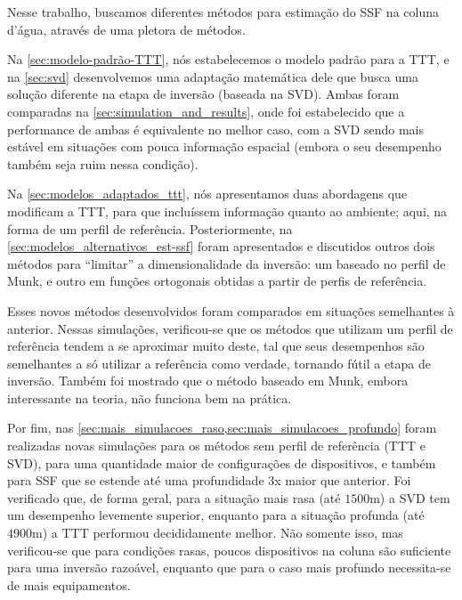 Nesse trabalho, buscamos diferentes métodos para estimação do SSF na coluna d'água, através de uma pletora de métodos.

Na \cref{sec:modelo-padrão-TTT}, nós estabelecemos o modelo padrão para a TTT, e na \cref{sec:svd} desenvolvemos uma adaptação matemática dele que busca uma solução diferente na etapa de inversão (baseada na SVD). Ambas foram comparadas na \cref{sec:simulation_and_results}, onde foi estabelecido que a performance de ambas é equivalente no melhor caso, com a SVD sendo mais estável em situações com pouca informação espacial (embora o seu desempenho também seja ruim nessa condição).

Na \cref{sec:modelos_adaptados_ttt}, nós apresentamos duas abordagens que modificam a TTT, para que incluíssem informação  quanto ao ambiente; aqui, na forma de um perfil de referência. Posteriormente, na \cref{sec:modelos_alternativos_est-ssf} foram apresentados e discutidos outros dois métodos para ``limitar'' a dimensionalidade da inversão: um baseado no perfil de Munk, e outro em funções ortogonais obtidas a partir de perfis de referência.

Esses novos métodos desenvolvidos foram comparados em situações semelhantes à anterior. Nessas simulações, verificou-se que os métodos que utilizam um perfil de referência tendem a se aproximar muito deste, tal que seus desempenhos são semelhantes a só utilizar a referência como verdade, tornando fútil a etapa de inversão. Também foi mostrado que o método baseado em Munk, embora interessante na teoria, não funciona bem na prática.

Por fim, nas \cref{sec:mais_simulacoes_raso,sec:mais_simulacoes_profundo} foram realizadas novas simulações para os métodos sem perfil de referência (TTT e SVD), para uma quantidade maior de configurações de dispositivos, e também para SSF que se estende até uma profundidade 3x maior que anterior. Foi verificado que, de forma geral, para a situação mais rasa (até $1500\si{\meter}$) a SVD tem um desempenho levemente superior, enquanto para a situação profunda (até $4900\si{\meter}$) a TTT performou decididamente melhor. Não somente isso, mas verificou-se que para condições rasas, poucos dispositivos na coluna são suficiente para uma inversão razoável, enquanto que para o caso mais profundo necessita-se de mais equipamentos.